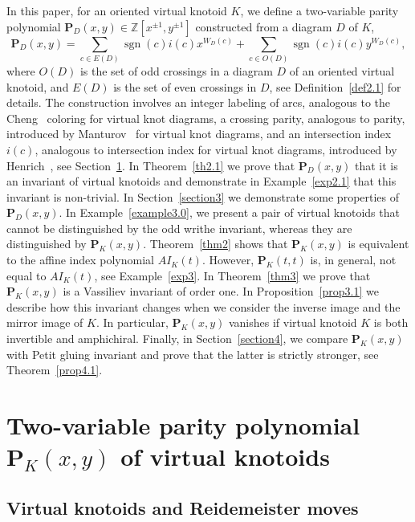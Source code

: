\documentclass[12pt]{amsart}
\theoremstyle{noparens}
\numberwithin{equation}{section}
\numberwithin{equation}{section}
\begin{document}
In this paper, for an oriented virtual  knotoid $K$, we define a two-variable parity polynomial $\mathbf{P}_D(x,y) \in \mathbb Z[x^{\pm 1},  y^{\pm 1}]$ constructed from a diagram $D$ of $K$, 
$$
\mathbf{P}_D(x,y)=\sum_{c \in E(D)} \operatorname{sgn}(c) i(c) x^{W_D(c)} + \sum_{c \in O(D)} \operatorname{sgn}(c) i(c) y^{W_D(c)}, 
$$
where $O(D)$ is the set of odd crossings in a diagram $D$ of an oriented virtual knotoid, and $E(D)$ is the set of even crossings in $D$, see Definition~\ref{def2.1} for details. The construction involves an integer labeling of arcs, analogous to the Cheng~\cite{Che} coloring for virtual knot diagrams, a crossing parity, analogous to parity, introduced by Manturov~\cite{Man} for virtual knot diagrams, and an intersection index $i(c)$, analogous to intersection index for virtual knot diagrams, introduced by Henrich~\cite{Hen}, see Section~\ref{section2}. In Theorem~\ref{th2.1} we prove that $\mathbf{P}_D(x,y)$ that it is an invariant of virtual knotoids and demonstrate in Example~\ref{exp2.1} that this invariant is non-trivial. In Section~\ref{section3} we demonstrate some properties of $\mathbf{P}_D(x,y)$. In Example~\ref{example3.0}, we present a pair of virtual knotoids that cannot be distinguished by the odd writhe invariant, whereas they are distinguished by $\mathbf{P}_K(x,y)$. Theorem~\ref{thm2} shows that $\textbf{P}_K(x,y)$ is equivalent to the affine index polynomial $AI_K(t)$. However, $\mathbf{P}_K(t,t)$ is, in general, not equal to $AI_K(t)$, see Example~\ref{exp3}. In Theorem~\ref{thm3} we prove  that $\textbf{P}_K(x,y)$ is a Vassiliev invariant of order one. In Proposition~\ref{prop3.1} we describe how this invariant changes when we consider  the inverse image and the mirror image of $K$. In particular, $\textbf{P}_K(x,y)$ vanishes if virtual knotoid $K$ is both invertible and amphichiral.  Finally, in Section~\ref{section4}, we compare $\textbf{P}_K(x,y)$ with Petit gluing invariant and prove that the latter is strictly stronger, see Theorem~\ref{prop4.1}.  

\section{Two-variable parity polynomial $\mathbf{P}_K(x,y)$ of virtual knotoids} \label{section2}

\subsection{Virtual knotoids and Reidemeister moves} \label{subsection2.1}
\end{document}
